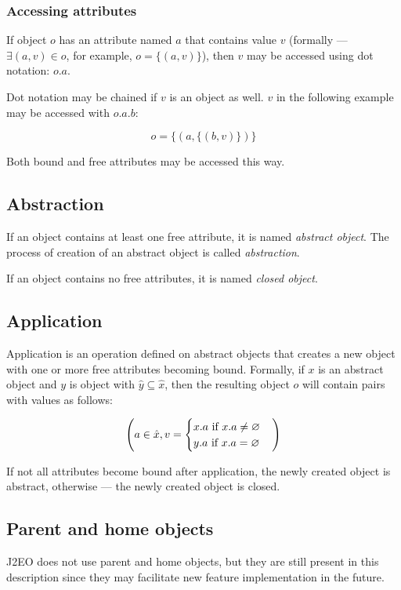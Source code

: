 \subsubsection{Accessing attributes}
If object $o$ has an attribute named $a$ that contains value $v$ (formally --- $\exists (a, v) \in o$, for example, $o = \{ (a, v) \}$), then $v$ may be accessed using dot notation: $o.a$.

Dot notation may be chained if $v$ is an object as well. $v$ in the following example may be accessed with $o.a.b$:

\[ o = \{ (a, \{(b, v)\}) \} \]

Both bound and free attributes may be accessed this way.

\subsection{Abstraction}
If an object contains at least one free attribute, it is named \emph{abstract object}. The process of creation of an abstract object is called \emph{abstraction}.

If an object contains no free attributes, it is named \emph{closed object}.

\subsection{Application}
Application is an operation defined on abstract objects that creates a new object with one or more free attributes becoming bound. Formally, if $x$ is an abstract object and $y$ is object with $\hat{y} \subseteq \hat{x}$, then the resulting object $o$ will contain pairs with values as follows:

\[
    \left(
        a \in \hat{x}, v =
        \begin{cases}
            x.a \textnormal{ if } x.a \neq \varnothing \\
            y.a \textnormal{ if } x.a = \varnothing
        \end{cases}
    \right)
\]

If not all attributes become bound after application, the newly created object is abstract, otherwise --- the newly created object is closed.

\subsection{Parent and home objects}
J2EO does not use parent and home objects, but they are still present in this description since they may facilitate new feature implementation in the future.

